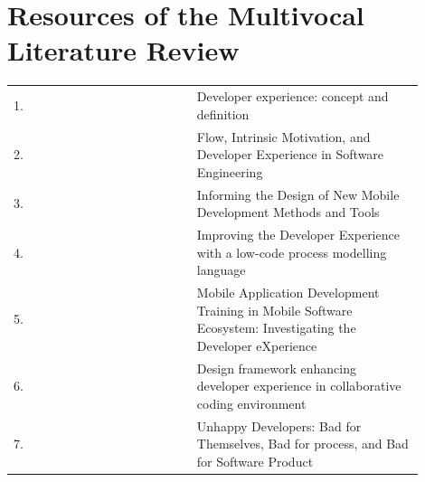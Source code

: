 \documentclass[english, 12pt, a4paper, sci, utf8, a-1b, online]{aaltothesis}
\begin{document}
\clearpage
\thesisbibliography
\printbibliography

\clearpage
\thesisappendix

\section{Resources of the Multivocal Literature Review}

\renewcommand{\arraystretch}{1.5}

\begin{center}
  \begin{longtable}{p{0.05\linewidth}p{0.35\linewidth}p{0.5\linewidth}}
    \label{table:scientific-articles}                                                                                                                                                                         \\
    1.  & \textcite{fagerholm-dx-concept-and-definition}        & Developer experience: concept and definition                                                                                                \\
    2.  & \textcite{flow-intrinsic-dx}                          & Flow, Intrinsic Motivation, and Developer Experience in Software Engineering                                                                \\
    3.  & \textcite{nebeling2013informing}                      & Informing the Design of New Mobile Development Methods and Tools                                                                            \\
    4.  & \textcite{henriques2018improving}                     & Improving the Developer Experience with a low-code process modelling language                                                               \\
    5.  & \textcite{fontao2018mobile}                           & Mobile Application Development Training in Mobile Software Ecosystem: Investigating the Developer eXperience                                \\
    6.  & \textcite{design-framework-enhancing}                & Design framework enhancing developer experience in collaborative coding environment                                                         \\
    7.  & \textcite{unhappy-developers}                         & Unhappy Developers: Bad for Themselves, Bad for process, and Bad for Software Product                                                       \\

\end{longtable}
\end{center}
\end{document}
